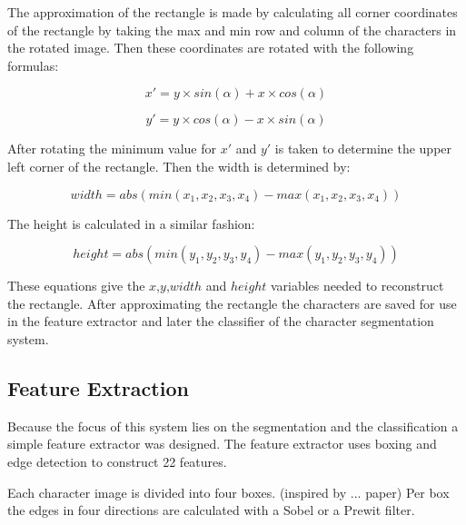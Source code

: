 The approximation of the rectangle is made by calculating  all corner coordinates of the rectangle by taking the max and min row and column of the characters in the rotated image. Then these coordinates are rotated with the following formulas:

\begin{equation}
    x' = y \times sin(\alpha) + x \times cos(\alpha)
\end{equation}

\begin{equation}
    y' = y \times cos(\alpha) - x \times sin(\alpha)
\end{equation}

After rotating the minimum value for $x'$ and $y'$ is taken to determine the upper left corner of the rectangle. Then the width is determined by:

\begin{equation}
    width = abs(min(x_1,x_2,x_3,x_4) - max(x_1,x_2,x_3,x_4))
\end{equation}

The height is calculated in a similar fashion:

\begin{equation}
    height = abs(min(y_1,y_2,y_3,y_4) - max(y_1,y_2,y_3,y_4))
\end{equation}

These equations give the $x$,$y$,$width$ and $height$ variables needed to reconstruct the rectangle. After approximating the rectangle the characters are saved for use in the feature extractor and later the classifier of the character segmentation system.

\subsection{Feature Extraction}


Because the focus of this system lies on the segmentation and the classification a simple feature extractor was designed. The feature extractor uses boxing and edge detection to construct 22 features.

Each character image is divided into four boxes. (inspired by ... paper) Per box the edges in four directions are calculated with a Sobel or a Prewit filter.

